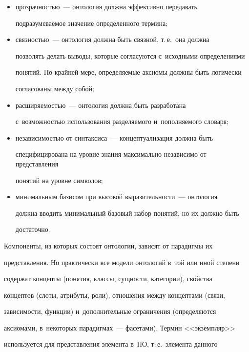   \begin{itemize}


  \item прозрачностью~--- онтология должна эффективно передавать 


подразумева\-емое значение определенного термина;


  \item связностью~--- онтология должна быть связной, т.\,е.\ она должна 


позволять делать выводы, которые согласуются с~исходными определениями 


понятий. По крайней мере, определяемые аксиомы должны быть логически 


согласованы между собой;


  \item расширяемостью~--- онтология должна быть разработана 


с~возможностью использования разделяемого и~пополняемого словаря;


  \item  независимостью от синтаксиса~--- концептуализация должна быть 


специфицирована на уровне знания максимально независимо от представления 


понятий на уровне символов;


  \item минимальным базисом при высокой выразительности~--- онтология 


должна вводить минимальный базовый набор понятий, но их должно быть 


достаточно.


  \end{itemize}


  


  Компоненты, из которых состоят онтологии, зависят от парадигмы их 


представления. Но практически все модели онтологий в~той или иной степени 


содержат концепты (понятия, классы, сущности, категории), свойства 


концептов (слоты, атрибуты, роли), отношения между концептами (связи, 


зависимости, функции) и~дополнительные ограничения (определяются 


аксиомами, в~некоторых парадигмах~--- фасетами). Термин <<экземпляр>> 


используется для представления элемента в~ПО, т.\,е.\ элемента данного 


